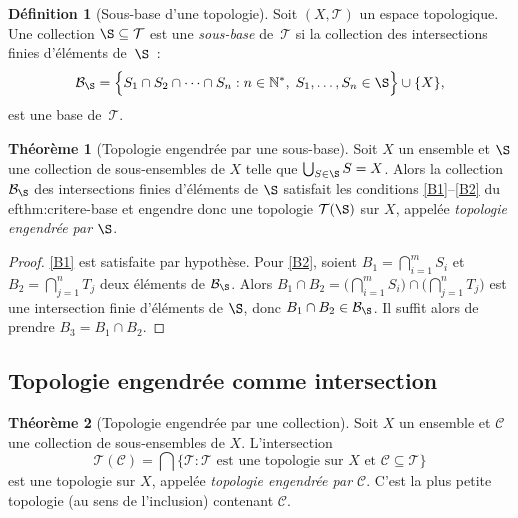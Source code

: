 \documentclass[12pt,a4paper,openany]{book}
\theoremstyle{definition}
\newtheorem{definition}{Définition}[chapter]
\theoremstyle{cours}
\newtheorem{theoreme}{Théorème}[chapter]
\theoremstyle{coursnormal}
\newcommand{\N}{\mathbb{N}}
\newcommand{\T}{\mathcal{T}}
\newcommand{\B}{\mathcal{B}}
\begin{document}
\begin{definition}[Sous-base d'une topologie]\label{def:sousbase}
  Soit $(X,\T)$ un espace topologique. Une collection
  $\S\subseteq\T$ est une \emph{sous-base} de~$\T$ si la
  collection des intersections finies d'éléments de~$\S$~:
  \[
    \B_{\S} = \Bigl\{ S_1\cap S_2\cap\cdots\cap S_n :
    n\in\N^*,\; S_1,\ldots,S_n\in\S \Bigr\} \cup \{X\},
  \]
  est une base de~$\T$.
\end{definition}

\begin{theoreme}[Topologie engendrée par une sous-base]\label{thm:topo-sousbase}
  Soit $X$ un ensemble et $\S$ une collection de sous-ensembles de $X$ telle
  que $\bigcup_{S\in\S} S = X$. Alors la collection $\B_{\S}$ des
  intersections finies d'éléments de $\S$ satisfait les conditions
  \ref{B1}--\ref{B2} du 
ef{thm:critere-base} et engendre donc une
  topologie $\T(\S)$ sur $X$, appelée \emph{topologie engendrée par
  $\S$}.
\end{theoreme}

\begin{proof}
  \ref{B1} est satisfaite par hypothèse. Pour \ref{B2}, soient
  $B_1 = \bigcap_{i=1}^{m} S_i$ et $B_2 = \bigcap_{j=1}^{n} T_j$ deux
  éléments de $\B_{\S}$. Alors
  $B_1\cap B_2 = \bigl(\bigcap_{i=1}^{m} S_i\bigr) \cap
  \bigl(\bigcap_{j=1}^{n} T_j\bigr)$ est une intersection finie d'éléments
  de $\S$, donc $B_1\cap B_2\in\B_{\S}$. Il suffit alors de prendre
  $B_3 = B_1\cap B_2$.
\end{proof}

\subsection{Topologie engendrée comme intersection}\label{subsec:topo-engendree}

\begin{theoreme}[Topologie engendrée par une collection]\label{thm:topo-engendree}
  Soit $X$ un ensemble et $\mathcal{C}$ une collection de sous-ensembles de
  $X$. L'intersection
  \[
    \T(\mathcal{C}) = \bigcap \bigl\{ \T : \T \text{ est une topologie sur }
    X \text{ et } \mathcal{C}\subseteq\T \bigr\}
  \]
  est une topologie sur $X$, appelée \emph{topologie engendrée par
  $\mathcal{C}$}. C'est la plus petite topologie (au sens de l'inclusion)
  contenant $\mathcal{C}$.
\end{theoreme}
\end{document}
